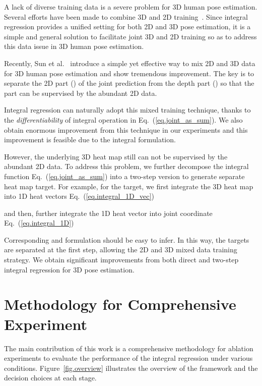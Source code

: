 \documentclass[runningheads]{llncs}
\begin{document}
A lack of diverse training data is a severe problem for 3D human pose estimation. Several efforts have been made to combine 3D and 2D training~\cite{zhou2017towards,mehta2016monocular,tekin2017learning,yasin2016dual,rogez2016mocap}. Since integral regression provides a unified setting for both 2D and 3D pose estimation, it is a simple and general solution to facilitate joint 3D and 2D training so as to address this data issue in 3D human pose estimation.

Recently, Sun et al.~\cite{sun2017compositional} introduce a simple yet effective way to mix 2D and 3D data for 3D human pose estimation and show tremendous improvement. The key is to separate the 2D part () of the joint prediction  from the depth part () so that the  part can be supervised by the abundant 2D data.

Integral regression can naturally adopt this mixed training technique, thanks to the \emph{differentiability} of integral operation in Eq.~(\ref{eq.joint_as_sum}). We also obtain enormous improvement from this technique in our experiments and this improvement is feasible due to the integral formulation. 

However, the underlying 3D heat map still can not be supervised by the abundant 2D data. To address this problem, we further decompose the integral function Eq.~(\ref{eq.joint_as_sum}) into a two-step version to generate separate  heat map target. For example, for the  target, we first integrate the 3D heat map into 1D  heat vectors Eq.~(\ref{eq.integral_1D_vec})

and then, further integrate the 1D  heat vector into  joint coordinate Eq.~(\ref{eq.integral_1D})

Corresponding  and  formulation should be easy to infer. In this way, the  targets are separated at the first step, allowing the 2D and 3D mixed data training strategy. We obtain significant improvements from both direct and two-step integral regression for 3D pose estimation.

\section{Methodology for Comprehensive Experiment}
\label{sec.exp_method}

The main contribution of this work is a comprehensive methodology for ablation experiments to evaluate the performance of the integral regression under various conditions. Figure~\ref{fig.overview} illustrates the overview of the framework and the decision choices at each stage.
\end{document}
